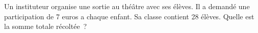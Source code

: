 \documentclass[exercice]{thedocument}%
\begin{document}
%
Un instituteur organise une sortie au théâtre avec ses élèves. Il a
demandé une participation de 7 euros a chaque enfant. Sa classe contient 28
élèves. Quelle est la somme totale récoltée~?
\end{document}
